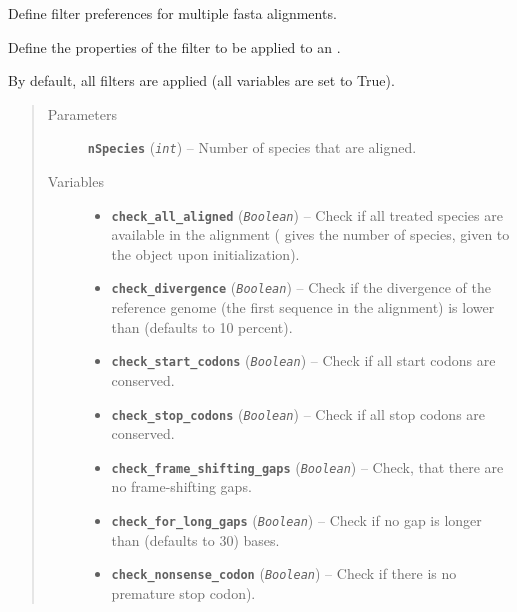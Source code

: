 \documentclass[letterpaper,10pt,english]{sphinxmanual}
\begin{document}
\begin{fulllineitems}
\label{fasta:libPoMo.fasta.MFaStrFilterProps}
Define filter preferences for multiple fasta alignments.

Define the properties of the filter to be applied to an
{\hyperref[fasta:libPoMo.fasta.MFaStream]{}}.

By default, all filters are applied (all variables are set to
True).
\begin{quote}\begin{description}
\item[{Parameters}] \leavevmode
\textbf{\texttt{nSpecies}} (\emph{\texttt{int}}) -- Number of species that are aligned.

\item[{Variables}] \leavevmode\begin{itemize}
\item {} 
\textbf{\texttt{check\_all\_aligned}} (\emph{\texttt{Boolean}}) -- Check if all treated species
are available in the alignment ( gives the number
of species, given to the object upon initialization).

\item {} 
\textbf{\texttt{check\_divergence}} (\emph{\texttt{Boolean}}) -- Check if the divergence of the
reference genome (the first sequence in the alignment) is lower
than  (defaults to 10 percent).

\item {} 
\textbf{\texttt{check\_start\_codons}} (\emph{\texttt{Boolean}}) -- Check if all start codons
are conserved.

\item {} 
\textbf{\texttt{check\_stop\_codons}} (\emph{\texttt{Boolean}}) -- Check if all stop codons are
conserved.

\item {} 
\textbf{\texttt{check\_frame\_shifting\_gaps}} (\emph{\texttt{Boolean}}) -- Check, that there
are no frame-shifting gaps.

\item {} 
\textbf{\texttt{check\_for\_long\_gaps}} (\emph{\texttt{Boolean}}) -- Check if no gap is longer
than  (defaults to 30) bases.

\item {} 
\textbf{\texttt{check\_nonsense\_codon}} (\emph{\texttt{Boolean}}) -- Check if there is no
premature stop codon).


\end{itemize}
\end{description}
\end{quote}
\end{fulllineitems}
\end{document}
